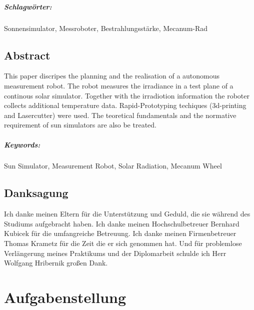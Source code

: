 \documentclass[a4paper,bibtotoc,oneside]{scrbook}
\begin{document}
\paragraph*{Schlagwörter:} Sonnensimulator, Messroboter, Bestrahlungsstärke, Mecanum-Rad


\newpage

\section*{Abstract}\thispagestyle{empty}
This paper discripes the planning and the realisation of a autonomous measurement robot. The robot measures the irradiance in a test plane of a continous solar simulator. Together with the irradiotion information the roboter collects additional temperature data. Rapid-Prototyping techiques (3d-printing and Lasercutter) were used. The teoretical fundamentals and the normative requirement of sun simulators are also be treated.
\\ \vfill
\paragraph*{Keywords:} Sun Simulator, Measurement Robot, Solar Radiation, Mecanum Wheel
\newpage

\section*{Danksagung}\thispagestyle{empty}
Ich danke meinen Eltern für die Unterstützung und Geduld, die sie während des Studiums aufgebracht haben.
Ich danke meinen Hochschulbetreuer Bernhard Kubicek für die umfangreiche Betreuung.
Ich danke meinen Firmenbetreuer Thomas Krametz für die Zeit die er sich genommen hat.
Und für problemlose Verlängerung meines Praktikums und der Diplomarbeit schulde ich Herr Wolfgang Hribernik großen Dank.
\newpage

\tableofcontents\thispagestyle{empty}
\newpage

\setcounter{page}{1}

\chapter{Aufgabenstellung}
\end{document}
